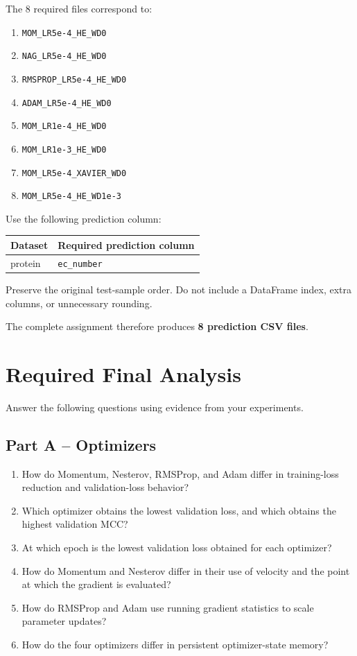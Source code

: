\documentclass[11pt]{article}
\begin{document}
The 8 required files correspond to:
\begin{enumerate}
    \item \texttt{MOM\_LR5e-4\_HE\_WD0}
    \item \texttt{NAG\_LR5e-4\_HE\_WD0}
    \item \texttt{RMSPROP\_LR5e-4\_HE\_WD0}
    \item \texttt{ADAM\_LR5e-4\_HE\_WD0}
    \item \texttt{MOM\_LR1e-4\_HE\_WD0}
    \item \texttt{MOM\_LR1e-3\_HE\_WD0}
    \item \texttt{MOM\_LR5e-4\_XAVIER\_WD0}
    \item \texttt{MOM\_LR5e-4\_HE\_WD1e-3}
\end{enumerate}

Use the following prediction column:

\begin{center}
\begin{tabular}{ll}
\toprule
Dataset & Required prediction column \\
\midrule
protein & \texttt{ec\_number} \\
\bottomrule
\end{tabular}
\end{center}

Preserve the original test-sample order. Do not include a DataFrame index, extra columns, or unnecessary rounding.

The complete assignment therefore produces \textbf{8 prediction CSV files}.

\section{Required Final Analysis}
Answer the following questions using evidence from your experiments.

\subsection*{Part A -- Optimizers}
\begin{enumerate}
    \item How do Momentum, Nesterov, RMSProp, and Adam differ in training-loss reduction and validation-loss behavior?
    \item Which optimizer obtains the lowest validation loss, and which obtains the highest validation MCC?
    \item At which epoch is the lowest validation loss obtained for each optimizer?
    \item How do Momentum and Nesterov differ in their use of velocity and the point at which the gradient is evaluated?
    \item How do RMSProp and Adam use running gradient statistics to scale parameter updates?
    \item How do the four optimizers differ in persistent optimizer-state memory?
\end{enumerate}
\end{document}
